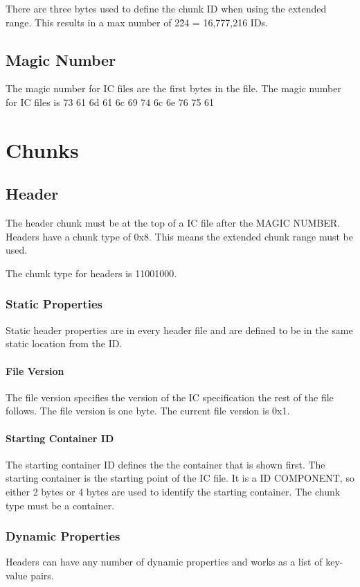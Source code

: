 \documentclass{report}
\begin{document}
There are three bytes used to define the chunk ID when using the extended range. This results in a max number of 2\^24 = 16,777,216 IDs.

\section{Magic Number}
The magic number for IC files are the first bytes in the file.
The magic number for IC files is 73 61 6d 61 6c 69 74 6c 6e 76 75 61


\chapter{Chunks}

\section{Header}
The header chunk must be at the top of a IC file after the MAGIC NUMBER. 
Headers have a chunk type of 0x8.
This means the extended chunk range must be used.

The chunk type for headers is 11001000. 

\subsection{Static Properties}
Static header properties are in every header file and are defined to be in the same static location from the ID. 

\subsubsection{File Version}
The file version specifies the version of the IC specification the rest of the file follows. The file version is one byte.
The current file version is 0x1.

\subsubsection{Starting Container ID}
The starting container ID defines the the container that is shown first. The starting container is the starting point of the IC file. It is a ID COMPONENT, so either 2 bytes or 4 bytes are used to identify the starting container. The chunk type must be a container.

\subsection{Dynamic Properties}
Headers can have any number of dynamic properties and works as a list of key-value pairs.
\end{document}
